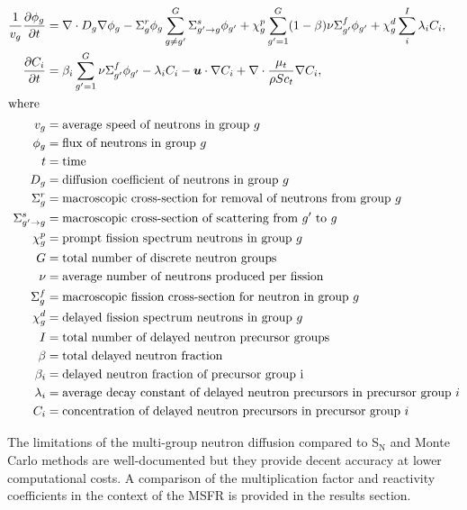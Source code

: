 \begin{align}
	\frac{1}{v_g} \frac{\partial \phi_g}{\partial t} &= \nabla \cdot D_g
	\nabla \phi_g - \Sigma^r_g \phi_g
	\sum^G_{g \neq g'} \Sigma^s_{g' \rightarrow g} \phi_{g'} + \chi^p_g
	\sum^G_{g'=1} (1-\beta) \nu \Sigma^f_{g'} \phi_{g'} + \chi^d_g \sum^I_i
	\lambda_i C_i, \label{eq:neut} \\
	\frac{\partial C_i}{\partial t} &= \beta_i \sum^G_{g'=1} \nu \Sigma^f_{g'}
	\phi_{g'} - \lambda_i C_i - \boldsymbol{u} \cdot \nabla C_i + \nabla \cdot
	\frac{\mu_t}{\rho Sc_t} \nabla C_i, \label{eq:dnp} \\
	\intertext{where} v_g &= \text{average speed of neutrons in group }g 
	\nonumber \\
	\phi_g &= \text{flux of neutrons in group }g \nonumber \\
	t &= \text{time} \nonumber \\
	D_g &= \text{diffusion coefficient of neutrons in group }g \nonumber \\
	\Sigma^r_g &= \text{macroscopic cross-section for removal of neutrons from
	group }g \nonumber \\
	\Sigma^s_{g' \rightarrow g} &= \text{macroscopic cross-section of
	scattering from }g' \text{ to }g \nonumber \\
	\chi^p_g &= \text{prompt fission spectrum neutrons in group }g \nonumber
	\\
	G &= \text{total number of discrete neutron groups} \nonumber \\
	\nu &= \text{average number of neutrons produced per fission} \nonumber \\
	\Sigma^f_{g} &= \text{macroscopic fission cross-section for neutron in
	group }g \nonumber \\
	\chi^d_g &= \text{delayed fission spectrum neutrons in group }g \nonumber
	\\
	I &= \text{total number of delayed neutron precursor groups} \nonumber \\
	\beta &= \text{total delayed neutron fraction} \nonumber \\
	\beta_i &= \text{delayed neutron fraction of precursor group i} \nonumber
	\\
	\lambda_i &= \text{average decay constant of delayed neutron precursors in
	precursor group }i \nonumber \\
	C_i &= \text{concentration of delayed neutron precursors in precursor
	group }i \nonumber
\end{align}
%

The limitations of the multi-group neutron diffusion compared to
S$_{\text{N}}$ and Monte Carlo methods are well-documented but they provide
decent accuracy at lower computational costs. A comparison of the
multiplication factor and reactivity coefficients in the context of the
\gls{MSFR} is provided in the results section.

